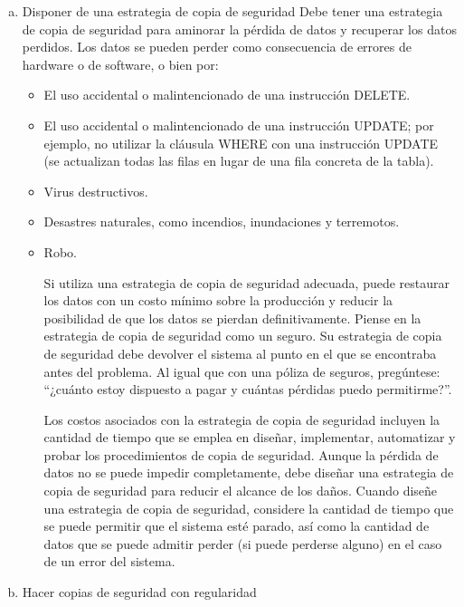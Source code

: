 \documentclass[a4paper,openright,12pt]{book}
\begin{document}
\begin{enumerate}[a)]
\item Disponer de una estrategia de copia de seguridad
Debe tener una estrategia de copia de seguridad para aminorar la pérdida de datos y recuperar los datos perdidos. Los datos se pueden perder como consecuencia de errores de hardware o de software, o bien por:\begin{itemize}
\item El uso accidental o malintencionado de una instrucción DELETE.
\item El uso accidental o malintencionado de una instrucción UPDATE; por ejemplo, no utilizar la cláusula WHERE con una instrucción UPDATE (se actualizan todas las filas en lugar de una fila concreta de la tabla).
\item Virus destructivos.
\item Desastres naturales, como incendios, inundaciones y terremotos.
\item Robo.

Si utiliza una estrategia de copia de seguridad adecuada, puede restaurar los datos con un costo mínimo sobre la producción y reducir la posibilidad de que los datos se pierdan definitivamente. Piense en la estrategia de copia de seguridad como un seguro. Su estrategia de copia de seguridad debe devolver el sistema al punto en el que se encontraba antes del problema. Al igual que con una póliza de seguros, pregúntese: “¿cuánto estoy dispuesto a pagar y cuántas pérdidas puedo permitirme?”.

Los costos asociados con la estrategia de copia de seguridad incluyen la cantidad de tiempo que se emplea en diseñar, implementar, automatizar y probar los procedimientos de copia de seguridad. Aunque la pérdida de datos no se puede impedir completamente, debe diseñar una estrategia de copia de seguridad para reducir el alcance de los daños. Cuando diseñe una estrategia de copia de seguridad, considere la cantidad de tiempo que se puede permitir que el sistema esté parado, así como la cantidad de datos que se puede admitir perder (si puede perderse alguno) en el caso de un error del sistema.


        
\end{itemize}
\item Hacer copias de seguridad con regularidad


\end{enumerate}
\end{document}
